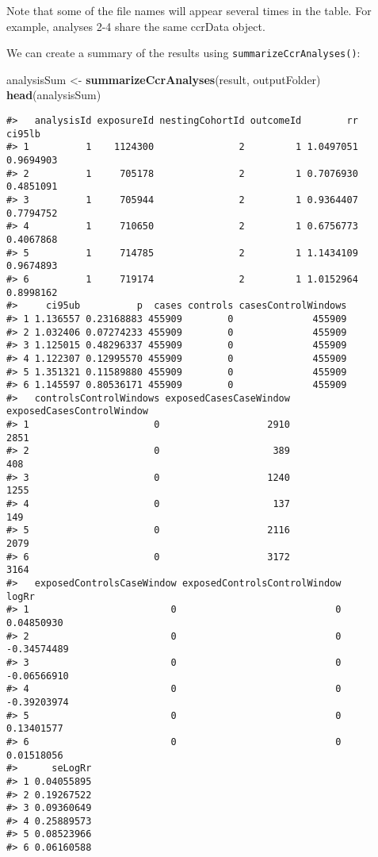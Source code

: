\documentclass[]{article}
\newenvironment{Shaded}{\begin{snugshade}}{\end{snugshade}}
\newcommand{\KeywordTok}[1]{\textcolor[rgb]{0.13,0.29,0.53}{\textbf{#1}}}
\newcommand{\NormalTok}[1]{#1}
\newcommand{\StringTok}[1]{\textcolor[rgb]{0.31,0.60,0.02}{#1}}
\begin{document}
Note that some of the file names will appear several times in the table.
For example, analyses 2-4 share the same ccrData object.

We can create a summary of the results using
\texttt{summarizeCcrAnalyses()}:

\begin{Shaded}
\begin{Highlighting}[]
\NormalTok{analysisSum <-}\StringTok{ }\KeywordTok{summarizeCcrAnalyses}\NormalTok{(result, outputFolder)}
\KeywordTok{head}\NormalTok{(analysisSum)}
\end{Highlighting}
\end{Shaded}

\begin{verbatim}
#>   analysisId exposureId nestingCohortId outcomeId        rr    ci95lb
#> 1          1    1124300               2         1 1.0497051 0.9694903
#> 2          1     705178               2         1 0.7076930 0.4851091
#> 3          1     705944               2         1 0.9364407 0.7794752
#> 4          1     710650               2         1 0.6756773 0.4067868
#> 5          1     714785               2         1 1.1434109 0.9674893
#> 6          1     719174               2         1 1.0152964 0.8998162
#>     ci95ub          p  cases controls casesControlWindows
#> 1 1.136557 0.23168883 455909        0              455909
#> 2 1.032406 0.07274233 455909        0              455909
#> 3 1.125015 0.48296337 455909        0              455909
#> 4 1.122307 0.12995570 455909        0              455909
#> 5 1.351321 0.11589880 455909        0              455909
#> 6 1.145597 0.80536171 455909        0              455909
#>   controlsControlWindows exposedCasesCaseWindow exposedCasesControlWindow
#> 1                      0                   2910                      2851
#> 2                      0                    389                       408
#> 3                      0                   1240                      1255
#> 4                      0                    137                       149
#> 5                      0                   2116                      2079
#> 6                      0                   3172                      3164
#>   exposedControlsCaseWindow exposedControlsControlWindow       logRr
#> 1                         0                            0  0.04850930
#> 2                         0                            0 -0.34574489
#> 3                         0                            0 -0.06566910
#> 4                         0                            0 -0.39203974
#> 5                         0                            0  0.13401577
#> 6                         0                            0  0.01518056
#>      seLogRr
#> 1 0.04055895
#> 2 0.19267522
#> 3 0.09360649
#> 4 0.25889573
#> 5 0.08523966
#> 6 0.06160588
\end{verbatim}
\end{document}
